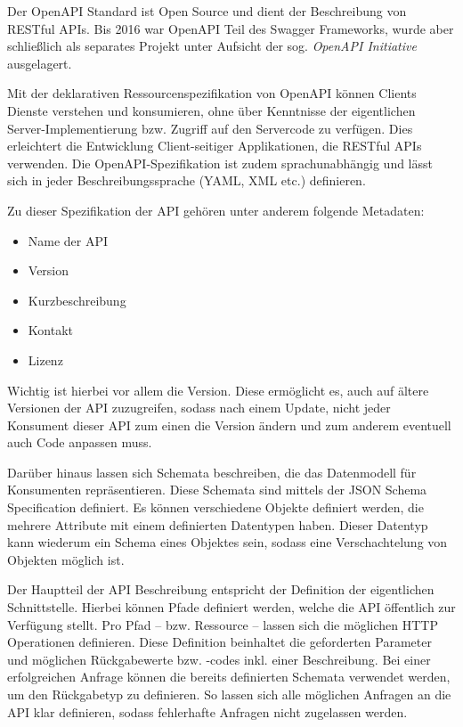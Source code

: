 			Der OpenAPI Standard ist Open Source und dient der Beschreibung von RESTful APIs. Bis 2016 war OpenAPI Teil des Swagger Frameworks, wurde aber schließlich als separates Projekt unter Aufsicht der sog. \textit{OpenAPI Initiative}  ausgelagert. 
			
			Mit der deklarativen Ressourcenspezifikation von OpenAPI können Clients Dienste verstehen und konsumieren, ohne über Kenntnisse der eigentlichen Server-Implementierung bzw. Zugriff auf den Servercode zu verfügen. Dies erleichtert die Entwicklung Client-seitiger Applikationen, die RESTful APIs verwenden. Die OpenAPI-Spezifikation ist zudem sprachunabhängig und lässt sich in jeder Beschreibungssprache (\acs{YAML}, \acs{XML} etc.) definieren. 
			
			Zu dieser Spezifikation der API gehören unter anderem folgende Metadaten:
			
			\begin{itemize}
				\item Name der API
				\item Version
				\item Kurzbeschreibung
				\item Kontakt
				\item Lizenz
			\end{itemize}
		
			Wichtig ist hierbei vor allem die Version. Diese ermöglicht es, auch auf ältere Versionen der \acs{API} zuzugreifen, sodass nach einem Update, nicht jeder Konsument dieser \acs{API} zum einen die Version ändern und zum anderem eventuell auch Code anpassen muss.
			
			Darüber hinaus lassen sich Schemata beschreiben, die das Datenmodell für Konsumenten repräsentieren. Diese Schemata sind mittels der \acs{JSON} Schema Specification definiert. Es können verschiedene Objekte definiert werden, die mehrere Attribute mit einem definierten Datentypen haben. Dieser Datentyp kann wiederum ein Schema eines Objektes sein, sodass eine Verschachtelung von Objekten möglich ist. \cite{.2252020}
			
			Der Hauptteil der API Beschreibung entspricht der Definition der eigentlichen Schnittstelle. Hierbei können Pfade definiert werden, welche die API öffentlich zur Verfügung stellt. Pro Pfad -- bzw. Ressource -- lassen sich die möglichen \acs{HTTP} Operationen definieren. Diese Definition beinhaltet die geforderten Parameter und möglichen Rückgabewerte bzw. -codes inkl. einer Beschreibung. Bei einer erfolgreichen Anfrage können die bereits definierten Schemata verwendet werden, um den Rückgabetyp zu definieren. So lassen sich alle möglichen Anfragen an die \acs{API} klar definieren, sodass fehlerhafte Anfragen nicht zugelassen werden.
			
